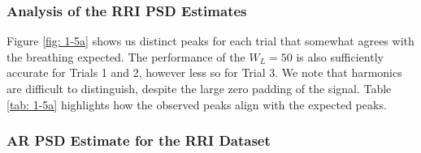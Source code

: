 \documentclass[12pt]{article}
\numberwithin{equation}{section}
\begin{document}
	\subsubsection{Analysis of the RRI PSD Estimates}
	
	Figure \ref{fig: 1-5a} shows us distinct peaks for each trial that somewhat agrees with the breathing expected. The performance of the $W_L=50$ is also sufficiently accurate for Trials 1 and 2, however less so for Trial 3. We note that harmonics are difficult to distinguish, despite the large zero padding of the signal. Table \ref{tab: 1-5a} highlights how the observed peaks align with the expected peaks.
	\pagebreak
	
	\subsubsection{AR PSD Estimate for the RRI Dataset}
	
\end{document}
